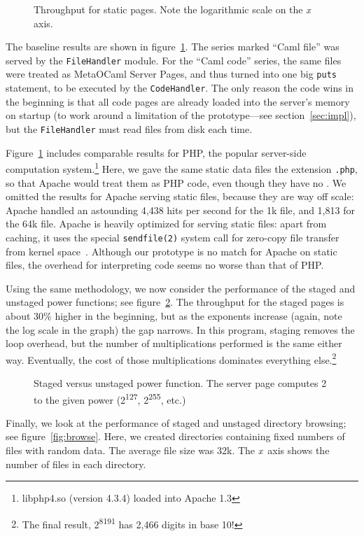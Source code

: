 \documentclass[preprint]{acm_proc_article-sp}
\def\MOC{MetaOCaml\xspace}
\newcommand{\myfig}[3]{%
  \begin{figure}[tbp]%
    #3%
    \caption{#2}%
    \label{fig:#1}%
  \end{figure}}
\newcommand{\gnuplot}[2]{%
  \myfig{#1}{#2}{}}
\begin{document}
\gnuplot{static}{Throughput for static pages.  Note the logarithmic
  scale on the \textit x axis.}

The baseline results are shown in figure~\ref{fig:static}.  The series
marked “Caml file” was served by the \texttt{FileHandler} module.  For
the “Caml code” series, the same files were treated as \MOC Server
Pages, and thus turned into one big \texttt{puts} statement, to be
executed by the \texttt{CodeHandler}.  The only reason the code
wins in the beginning is that all code pages are already loaded into
the server’s memory on startup (to work around a limitation of the
prototype---see section~\ref{sec:impl}), but the \texttt{FileHandler}
must read files from disk each time.

Figure~\ref{fig:static} includes comparable results for PHP, the
popular server-side computation system.\footnote{libphp4.so
  (version 4.3.4) loaded into Apache 1.3} Here, we gave the same
static data files the extension \texttt{.php}, so that Apache
would treat them as PHP code, even though they have no
.
We omitted the results for Apache serving static files, because they
are way off scale: Apache handled an astounding 4,438 hits per second
for the 1k file, and 1,813 for the 64k file.  Apache is heavily
optimized for serving static files: apart from caching, it uses the
special \texttt{sendfile(2)} system call for zero-copy file transfer
from kernel space~\cite{tranter03sendfile}.  Although our prototype is
no match for Apache on static files, the overhead for interpreting
code seems no worse than that of PHP.

Using the same methodology, we now consider the performance of
the staged and unstaged power functions; see
figure~\ref{fig:power}.  The throughput for the staged pages is
about 30\% higher in the beginning, but as the exponents
increase (again, note the log scale in the graph) the gap
narrows.  In this program, staging removes the loop overhead,
but the number of multiplications performed is the same either
way.  Eventually, the cost of those multiplications dominates
everything else.\footnote{The final result,
  2\textsuperscript{8191} has 2,466 digits in base 10!}

\gnuplot{power}{Staged versus unstaged power function.  The
  server page computes 2 to the given power
  (2\textsuperscript{127}, 2\textsuperscript{255}, etc.)}

Finally, we look at the performance of staged and unstaged directory
browsing; see figure~\ref{fig:browse}.  Here, we created directories
containing fixed numbers of files with random data.  The average file
size was 32k.  The \emph{x}~axis shows the number of files in each
directory.
\end{document}
